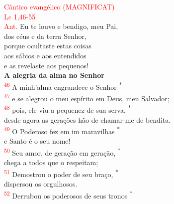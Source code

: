 \documentclass{book}
\begin{document}
\begin{center}
    \textcolor{red}{Cântico evangélico (MAGNIFICAT) \\ Lc 1,46-55}
    \vspace{.2cm} \\
    \textcolor{red}{Ant.} Eu te louvo e bendigo, meu Pai, \\
    dos céus e da terra Senhor, \\
    porque ocultaste estas coisas \\
    aos sábios e aos entendidos \\
    e as revelaste aos pequenos!
    \vspace{.2cm} \\
    \textbf{A alegria da alma no Senhor}
    \vspace{.2cm} \\
    \textsuperscript{\underline{\hspace{.07in}}\textcolor{red}{46}} A minh'alma engrandece o Senhor \textsuperscript{*} \\
    \textsuperscript{\textcolor{red}{47}} e se alegrou o meu espírito em Deus, meu Salvador; \\
    \textsuperscript{\underline{\hspace{.07in}}\textcolor{red}{48}} pois, ele viu a pequenez de sua serva, \textsuperscript{*}\\
    desde agora as gerações hão de chamar-me de bendita.
    \vspace{.2cm} \\
    \textsuperscript{\underline{\hspace{.07in}}\textcolor{red}{49}} O Poderoso fez em im maravilhas \textsuperscript{*} \\
    e Santo é o seu nome! \\
    \textsuperscript{\underline{\hspace{.07in}}\textcolor{red}{50}} Seu amor, de geração em geração, \textsuperscript{*} \\
    chega a todos que o respeitam;
    \vspace{.2cm} \\
    \textsuperscript{\underline{\hspace{.07in}}\textcolor{red}{51}} Demostrou o poder de seu braço, \textsuperscript{*} \\
    dispersou os orgulhosos. \\
    \textsuperscript{\underline{\hspace{.07in}}\textcolor{red}{52}} Derrubou os poderosos de seus tronos \textsuperscript{*} \\

\end{center}
\end{document}
